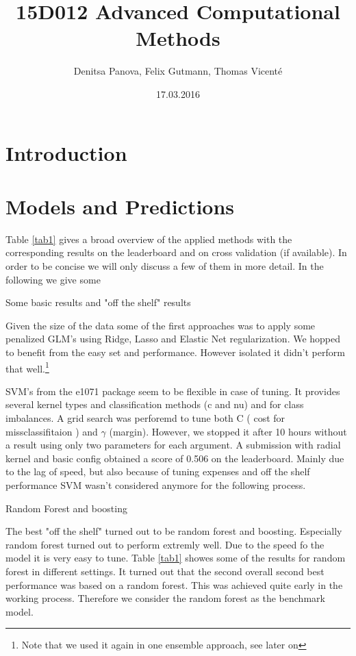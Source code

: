 \documentclass[fleqn]{article}
\title{15D012 Advanced Computational Methods}
\author{Denitsa Panova, Felix Gutmann, Thomas Vicenté}
\date{17.03.2016}
\begin{document}
\maketitle

\section*{Introduction}

\lipsum[2-4]

\section*{Models and Predictions}

Table \ref{tab1} gives a broad overview of the applied methods with the corresponding results on the leaderboard and on cross validation (if available). In order to be concise we will only discuss a few of them in more detail. In the following we give some 

Some basic results and "off the shelf" results

Given the size of the data some of the first approaches was to apply some penalized GLM's using Ridge, Lasso and Elastic Net regularization. We hopped to benefit from the easy set and performance. However isolated it didn't perform that well.\footnote{Note that we used it again in one ensemble approach, see later on}

SVM's from the e1071 package seem to be flexible in case of tuning. It provides several kernel types and classification methods (c and nu) and for class imbalances. A grid search was perforemd to tune both C ( cost for missclassifitaion ) and $\gamma$ (margin). However, we stopped it after 10 hours without a result using only two parameters for each argument. A submission with radial kernel and basic config obtained a score of 0.506 on the leaderboard.  Mainly due to the lag of speed, but also because of tuning expenses and off the shelf performance SVM wasn't considered anymore for the following process. 

Random Forest and boosting

The best "off the shelf" turned out to be random forest and boosting. Especially random forest turned out to perform extremly well. Due to the speed fo the model it is very easy to tune. Table \ref{tab1} showes some of the results for random forest in different settings. It turned out that the second overall second best performance was based on a random forest. This was achieved quite early in the working process. Therefore we consider the random forest as the benchmark model.
\end{document}
